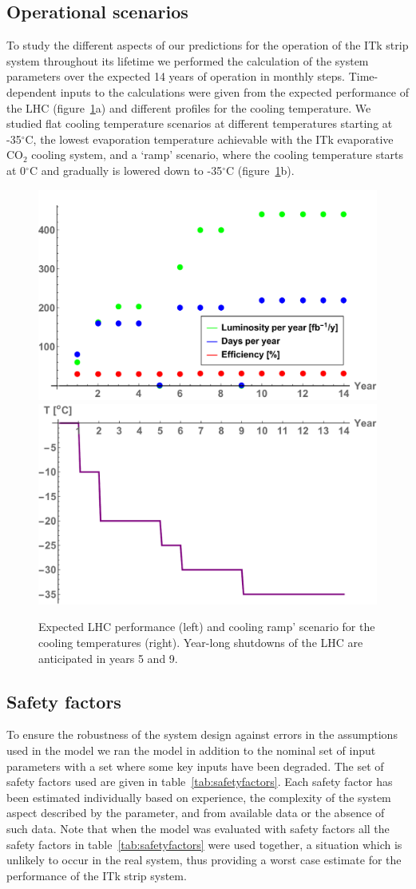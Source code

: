 
\subsection{Operational scenarios}\label{sec:opscenarios}
To study the different aspects of our predictions for the operation of the ITk strip system throughout its lifetime we performed the calculation of the system parameters over the expected 14 years of operation in monthly steps. Time-dependent inputs to the calculations were given from the expected performance of the LHC (figure~\ref{fig:opscenarios}a) and different profiles for the cooling temperature. We studied flat cooling temperature scenarios at different temperatures starting at -35$^\circ$C, the lowest evaporation temperature achievable with the ITk evaporative CO$_2$ cooling system, and a `ramp' scenario, where the cooling temperature starts at 0$^\circ$C and gradually is lowered down to -35$^\circ$C (figure~\ref{fig:opscenarios}b).

\begin{figure}[ht]
\centering
\includegraphics[width=0.4\linewidth]{figures/LHCperformance.pdf}\quad\quad
\includegraphics[width=0.4\linewidth]{figures/coolingramp.pdf}
\caption{Expected LHC performance (left) and cooling ramp' scenario for the cooling temperatures (right). Year-long shutdowns of the LHC are anticipated in years 5 and 9.}
\label{fig:opscenarios}
\end{figure}

\subsection{Safety factors}
To ensure the robustness of the system design against errors in the assumptions used in the model we ran the model in addition to the nominal set of input parameters with a set where some key inputs have been degraded. The set of safety factors used are given in table~\ref{tab:safetyfactors}. Each safety factor has been estimated individually based on experience, the complexity of the system aspect described by the parameter, and from available data or the absence of such data. Note that when the model was evaluated with safety factors all the safety factors in table~\ref{tab:safetyfactors} were used together, a situation which is unlikely to occur in the real system, thus providing a worst case estimate for the performance of the ITk strip system.

